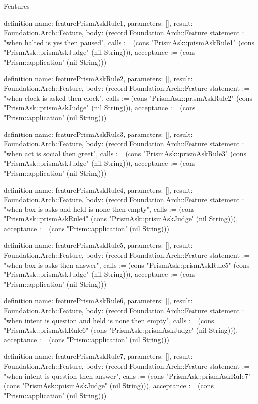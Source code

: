\begin{lexlean}{Features}
\begin{semanticmodule}
definition{
  name: featurePrismAskRule1,
  parameters: [],
  result: Foundation.Arch::Feature,
  body: (record Foundation.Arch::Feature {statement := "when halted is yes then paused", calls := (cons "PrismAsk::prismAskRule1" (cons "PrismAsk::prismAskJudge" (nil String))), acceptance := (cons "Prism::application" (nil String))})
}

definition{
  name: featurePrismAskRule2,
  parameters: [],
  result: Foundation.Arch::Feature,
  body: (record Foundation.Arch::Feature {statement := "when clock is asked then clock", calls := (cons "PrismAsk::prismAskRule2" (cons "PrismAsk::prismAskJudge" (nil String))), acceptance := (cons "Prism::application" (nil String))})
}

definition{
  name: featurePrismAskRule3,
  parameters: [],
  result: Foundation.Arch::Feature,
  body: (record Foundation.Arch::Feature {statement := "when act is social then greet", calls := (cons "PrismAsk::prismAskRule3" (cons "PrismAsk::prismAskJudge" (nil String))), acceptance := (cons "Prism::application" (nil String))})
}

definition{
  name: featurePrismAskRule4,
  parameters: [],
  result: Foundation.Arch::Feature,
  body: (record Foundation.Arch::Feature {statement := "when box is asks and held is none then empty", calls := (cons "PrismAsk::prismAskRule4" (cons "PrismAsk::prismAskJudge" (nil String))), acceptance := (cons "Prism::application" (nil String))})
}

definition{
  name: featurePrismAskRule5,
  parameters: [],
  result: Foundation.Arch::Feature,
  body: (record Foundation.Arch::Feature {statement := "when box is asks then answer", calls := (cons "PrismAsk::prismAskRule5" (cons "PrismAsk::prismAskJudge" (nil String))), acceptance := (cons "Prism::application" (nil String))})
}

definition{
  name: featurePrismAskRule6,
  parameters: [],
  result: Foundation.Arch::Feature,
  body: (record Foundation.Arch::Feature {statement := "when intent is question and held is none then empty", calls := (cons "PrismAsk::prismAskRule6" (cons "PrismAsk::prismAskJudge" (nil String))), acceptance := (cons "Prism::application" (nil String))})
}

definition{
  name: featurePrismAskRule7,
  parameters: [],
  result: Foundation.Arch::Feature,
  body: (record Foundation.Arch::Feature {statement := "when intent is question then answer", calls := (cons "PrismAsk::prismAskRule7" (cons "PrismAsk::prismAskJudge" (nil String))), acceptance := (cons "Prism::application" (nil String))})
}


\end{semanticmodule}
\end{lexlean}
